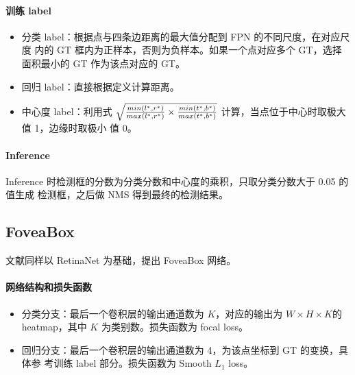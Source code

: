 \paragraph{训练 label}
\begin{itemize}
  \item 分类 label：根据点与四条边距离的最大值分配到 FPN 的不同尺度，在对应尺度
    内的 GT 框内为正样本，否则为负样本。如果一个点对应多个 GT，选择面积最小的 GT
    作为该点对应的 GT。
  \item 回归 label：直接根据定义计算距离。
  \item 中心度 label：利用式 $\sqrt{\frac{\\min(l^*,
        r^*)}{\\max(l^*, r^*)} \times \frac{\\min(t^*,
        b^*)}{\\max(t^*, b^*)}}$ 计算，当点位于中心时取极大值 1，边缘时取极小
        值 0。
\end{itemize}

\paragraph{Inference}
Inference 时检测框的分数为分类分数和中心度的乘积，只取分类分数大于 0.05 的值生成
检测框，之后做 NMS 得到最终的检测结果。

\subsection{FoveaBox}
文献同样以 RetinaNet 为基础，提出 FoveaBox 网络。 

\paragraph{网络结构和损失函数}
\begin{itemize}
  \item 分类分支：最后一个卷积层的输出通道数为 $K$，对应的输出为 $W \times H
    \times K$的 heatmap，其中 $K$ 为类别数。损失函数为 focal loss。
  \item 回归分支：最后一个卷积层的输出通道数为 4，为该点坐标到 GT 的变换，具体参
    考训练 label 部分。损失函数为 Smooth $L_1$ loss。
\end{itemize}

